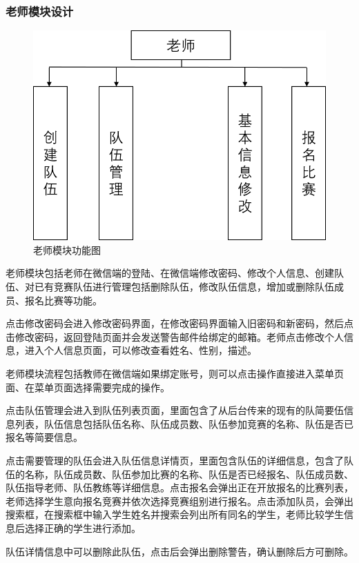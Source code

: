 \documentclass[a4paper]{ltxdoc}
\begin{document}
{		\subsubsection{老师模块设计}
		\begin{figure}[H]
			\centering
			\includegraphics[width=0.7\linewidth]{images/1-3.png}
			\caption{老师模块功能图}
		\end{figure}
		老师模块包括老师在微信端的登陆、在微信端修改密码、修改个人信息、创建队伍、对已有竞赛队伍进行管理包括删除队伍，修改队伍信息，增加或删除队伍成员、报名比赛等功能。
		
		点击修改密码会进入修改密码界面，在修改密码界面输入旧密码和新密码，然后点击修改密码，返回登陆页面并会发送警告邮件给绑定的邮箱。老师点击修改个人信息，进入个人信息页面，可以修改查看姓名、性别，描述。
		
		老师模块流程包括教师在微信端如果绑定账号，则可以点击操作直接进入菜单页面、在菜单页面选择需要完成的操作。
		
		点击队伍管理会进入到队伍列表页面，里面包含了从后台传来的现有的队简要伍信息列表，队伍信息包括队伍名称、队伍成员数、队伍参加竞赛的名称、队伍是否已报名等简要信息。
		
		点击需要管理的队伍会进入队伍信息详情页，里面包含队伍的详细信息，包含了队伍的名称，队伍成员数、队伍参加比赛的名称、队伍是否已经报名、队伍成员数、队伍指导老师、队伍教练等详细信息。点击报名会弹出正在开放报名的比赛列表，老师选择学生意向报名竞赛并依次选择竞赛组别进行报名。点击添加队员，会弹出搜索框，在搜索框中输入学生姓名并搜索会列出所有同名的学生，老师比较学生信息后选择正确的学生进行添加。
		
		队伍详情信息中可以删除此队伍，点击后会弹出删除警告，确认删除后方可删除。
		
}
\end{document}
